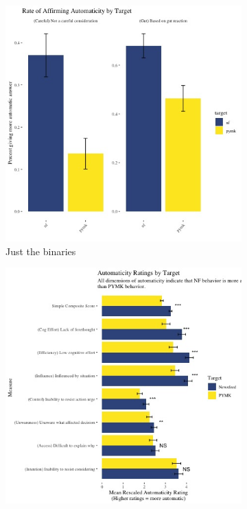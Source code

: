 \documentclass[12pt,letterpaper]{article}
\begin{document}
\begin{figure}
\begin{subfigure}{.5\textwidth}
        \includegraphics[width=1\linewidth]{Output/Graphs/Experiments/Automaticity/bar chart binary measures.jpg} 
        \caption{Just the binaries}
        \label{fig:auto_binaries}
    \end{subfigure}
    \begin{subfigure}{.5\textwidth}
        \centering
        \includegraphics[width=1\linewidth]{Output/Graphs/Experiments/Automaticity/composite score and components.jpg}  

\end{subfigure}
\end{figure}
\end{document}
